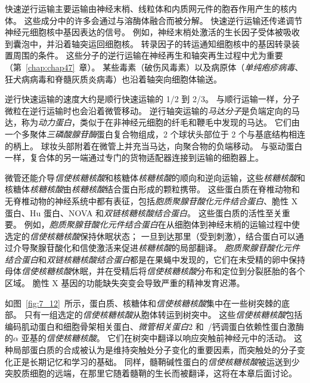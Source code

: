 快速逆行运输主要运输由神经末梢、线粒体和内质网元件的胞吞作用产生的核内体。
这些成分中的许多会通过与溶酶体融合而被分解。
快速逆行运输还传递调节神经元细胞核中基因表达的信号。
例如，神经末梢处激活的生长因子受体被吸收到囊泡中，并沿着轴突运回细胞核。
转录因子的转运通知细胞核中的基因转录装置周围的条件。
这些分子的逆行运输在神经再生和轴突再生过程中尤为重要（第~\ref{chap:chap47}~章）。 
某些毒素（破伤风毒素）以及病原体（\textit{单纯疱疹病毒}、狂犬病病毒和脊髓灰质炎病毒）也沿着轴突向细胞体输送。


逆行快速运输的速度大约是顺行快速运输的 1/2 到 2/3。
与顺行运输一样，分子微粒在逆行运输时也会沿着微管移动。
逆行轴突运输的\textit{马达分子}是负端定向的马达，称为\textit{动力蛋白}，类似于在非神经元细胞的纤毛和鞭毛中发现的马达。
它们由一个多聚体\textit{三磷酸腺苷酶}蛋白复合物组成，2 个球状头部位于 2 个与基底结构相连的柄上。
球妆头部附着在微管上并充当马达，向聚合物的负端移动。
与驱动蛋白一样，复合体的另一端通过专门的货物适配器连接到运输的细胞器上。


微管还能介导\textit{信使核糖核酸}和核糖体\textit{核糖核酸}的顺向和逆向运输，这些\textit{核糖核酸}和核糖体\textit{核糖核酸}由\textit{核糖核酸}结合蛋白形成的颗粒携带。
这些蛋白质在脊椎动物和无脊椎动物的神经系统中都有表征，包括\textit{胞质聚腺苷酸化元件结合蛋白}、脆性 X 蛋白、Hu 蛋白、NOVA 和\textit{双链核糖核酸结合蛋白}。
这些蛋白质的活性至关重要。
例如，\textit{胞质聚腺苷酸化元件结合蛋白}在从细胞体到神经末梢的运输过程中使选定的\textit{信使核糖核酸}保持休眠状态；
一旦到达那里（受到刺激），结合蛋白可以通过介导聚腺苷酸化和信使激活来促进\textit{核糖核酸}的局部翻译。
\textit{胞质聚腺苷酸化元件结合蛋白}和\textit{双链核糖核酸结合蛋白}都是在果蝇中发现的，它们在未受精的卵中保持母体\textit{信使核糖核酸}休眠，并在受精后将\textit{信使核糖核酸}分布和定位到分裂胚胎的各个区域。
脆性 X 基因的功能缺失突变会导致严重的精神发育迟滞。


如图~\ref{fig:7_12}~所示，蛋白质、核糖体和\textit{信使核糖核酸}集中在一些树突棘的底部。
只有一组选定的\textit{信使核糖核酸}从胞体转运到树突中。
这些\textit{信使核糖核酸}包括编码肌动蛋白和细胞骨架相关蛋白、\textit{微管相关蛋白}2 和~/钙调蛋白依赖性蛋白激酶的$\alpha$ 亚基的\textit{信使核糖核酸}。
它们在树突中翻译以响应突触前神经元中的活动。
这种局部蛋白质的合成被认为是维持突触处分子变化的重要因素，而突触处的分子变化正是长期记忆和学习的基础。
同样，髓鞘碱性蛋白的\textit{信使核糖核酸}被运送到少突胶质细胞的远端，在那里它随着髓鞘的生长而被翻译，这将在本章后面讨论。



